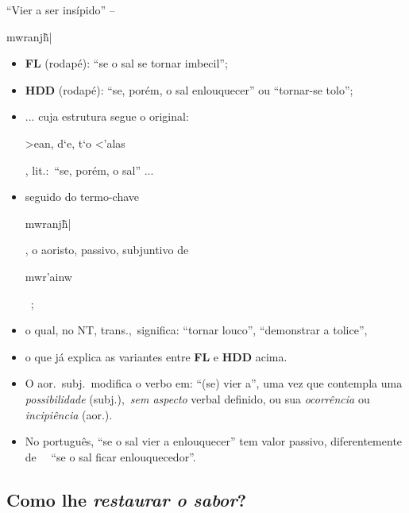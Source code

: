 \documentclass[12pt,aspectratio=169]{beamer}
\newcommand{\RED}[1]{{\textcolor{TXred}{#1}}}
\newcommand{\YEL}[1]{{\textcolor{TXyel}{#1}}}
\newcommand{\GRE}[1]{{\textcolor{TXgre}{#1}}}
\newcommand{\CYA}[1]{{\textcolor{TXcya}{#1}}}
\newcommand{\MAG}[1]{{\textcolor{TXmag}{#1}}}
\newcommand{\BRI}[1]{{\textcolor{BSpbg}{#1}}}   %
\newcommand{\GRtxt}[1]{\begin{otherlanguage}{greek}{{#1}}\end{otherlanguage}}
\begin{document}
    \begin{frame}{\BRI{``Vier a ser insípido''} -- \GRtxt{mwranj\~h|}}
        \begin{itemize}
            \item<1-> \BRI{\textbf{FL}} (rodapé): \MAG{``se o sal se tornar imbecil''};
                \\[\medskipamount]
            \item<2-> \BRI{\textbf{HDD}} (rodapé): \MAG{``se, porém, o sal enlouquecer''} ou
                \MAG{``tornar-se tolo''};
                \\[\medskipamount]
            \item<3-> ... cuja estrutura segue o original: \YEL{\GRtxt{>ean, d`e, t`o <'alas}},
                lit.:~\MAG{``se, porém, o sal''} ...
                \\[\medskipamount]
            \item<4-> seguido do termo-chave \BRI{\GRtxt{mwranj\~h|}}, o \GRE{aoristo},
                \GRE{passivo}, \GRE{subjuntivo} de
                \BRI{\GRtxt{mwr'ainw}}~\cite{2013-MounceWD-VidaNova,
                2007-FribergB+FribergT-VidaNova};
                \\[\medskipamount]
            \item<5-> o qual, no NT, trans.,~significa: \CYA{``tornar louco''},
                \CYA{``demonstrar a tolice''},
                \\[\medskipamount]
            \item<6-> o que já explica as variantes entre \BRI{\textbf{FL}} e \BRI{\textbf{HDD}}
                acima.
                \\[\medskipamount]
            \item<7-> O \GRE{aor.~subj.}~modifica o verbo em: \CYA{``}(se) \CYA{vier a''}, uma
                vez que contempla uma \BRI{\textit{possibilidade}}
                (\GRE{subj.}),~\BRI{\textit{sem aspecto}} verbal definido, ou sua
                \BRI{\textit{ocorrência}} ou \BRI{\textit{incipiência}} (\GRE{aor.}).
                \\[\medskipamount]
            \item<8-> No português, \MAG{``se o sal vier a enlouquecer''} tem valor
                \GRE{passivo}, diferentemente de \ \ \RED{``se o sal ficar enlouquecedor''}.
        \end{itemize}
    \end{frame}

    \subsection{Como lhe \textit{restaurar o sabor\/}?}
\end{document}
